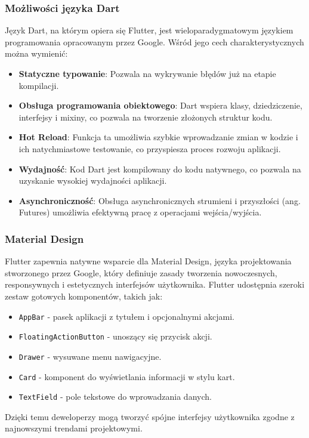 \subsubsection{Możliwości języka Dart}
Język Dart, na którym opiera się Flutter, jest wieloparadygmatowym językiem programowania opracowanym przez Google. Wśród jego cech charakterystycznych można wymienić:
\begin{itemize}
	\item \textbf{Statyczne typowanie}: Pozwala na wykrywanie błędów już na etapie kompilacji.
	\item \textbf{Obsługa programowania obiektowego}: Dart wspiera klasy, dziedziczenie, interfejsy i mixiny, co pozwala na tworzenie złożonych struktur kodu.
	\item \textbf{Hot Reload}: Funkcja ta umożliwia szybkie wprowadzanie zmian w kodzie i ich natychmiastowe testowanie, co przyspiesza proces rozwoju aplikacji.
	\item \textbf{Wydajność}: Kod Dart jest kompilowany do kodu natywnego, co pozwala na uzyskanie wysokiej wydajności aplikacji.
	\item \textbf{Asynchroniczność}: Obsługa asynchronicznych strumieni i przyszłości (ang. Futures) umożliwia efektywną pracę z operacjami wejścia/wyjścia.
\end{itemize}

\subsubsection{Material Design}
Flutter zapewnia natywne wsparcie dla Material Design, języka projektowania stworzonego przez Google, który definiuje zasady tworzenia nowoczesnych, responsywnych i estetycznych interfejsów użytkownika. Flutter udostępnia szeroki zestaw gotowych komponentów, takich jak:\
\begin{itemize}
	\item \texttt{AppBar} - pasek aplikacji z tytułem i opcjonalnymi akcjami.
	\item \texttt{FloatingActionButton} - unoszący się przycisk akcji.
	\item \texttt{Drawer} - wysuwane menu nawigacyjne.
	\item \texttt{Card} - komponent do wyświetlania informacji w stylu kart.
	\item \texttt{TextField} - pole tekstowe do wprowadzania danych.
\end{itemize}
Dzięki temu deweloperzy mogą tworzyć spójne interfejsy użytkownika zgodne z najnowszymi trendami projektowymi.

